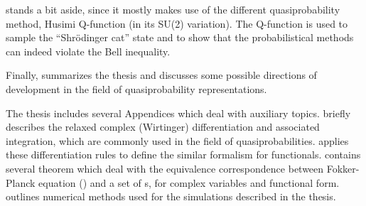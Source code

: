  stands a bit aside, since it mostly makes use of the different quasiprobability method, Husimi Q-function (in its SU(2) variation).
The Q-function is used to sample the ``Shr\"odinger cat'' state and to show that the probabilistical methods can indeed violate the Bell inequality.

Finally,  summarizes the thesis and discusses some possible directions of development in the field of quasiprobability representations.

The thesis includes several Appendices which deal with auxiliary topics.
 briefly describes the relaxed complex (Wirtinger) differentiation and associated integration, which are commonly used in the field of quasiprobabilities.
 applies these differentiation rules to define the similar formalism for functionals.
 contains several theorem which deal with the equivalence correspondence between Fokker-Planck equation () and a set of s, for complex variables and functional form.
 outlines numerical methods used for the simulations described in the thesis.
